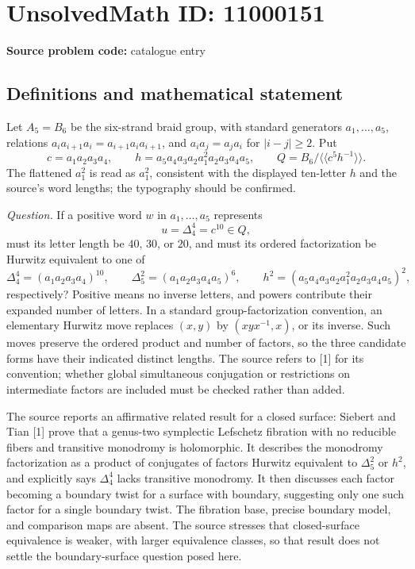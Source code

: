 \documentclass[11pt]{article}
\begin{document}
\section*{UnsolvedMath ID: 11000151}
\textbf{Source problem code:} catalogue entry
\subsection{Definitions and mathematical statement}
Let \(A_5=B_6\) be the six-strand braid group, with standard generators \(a_1,\ldots,a_5\), relations \(a_i a_{i+1}a_i=a_{i+1}a_i a_{i+1}\), and \(a_i a_j=a_j a_i\) for \(|i-j|\geq2\). Put
\[
 c=a_1a_2a_3a_4,\qquad
 h=a_5a_4a_3a_2a_1^2a_2a_3a_4a_5,
 \qquad Q=B_6/\langle\!\langle c^5h^{-1}\rangle\!\rangle.
\]
The flattened \(a^2_1\) is read as \(a_1^2\), consistent with the displayed ten-letter \(h\) and the source's word lengths; the typography should be confirmed.

\emph{Question.} If a positive word \(w\) in \(a_1,\ldots,a_5\) represents
\[
 u=\Delta_4^4=c^{10}\in Q,
\]
must its letter length be \(40\), \(30\), or \(20\), and must its ordered factorization be Hurwitz equivalent to one of
\[
 \Delta_4^4=(a_1a_2a_3a_4)^{10},\qquad
 \Delta_5^2=(a_1a_2a_3a_4a_5)^6,\qquad
 h^2=(a_5a_4a_3a_2a_1^2a_2a_3a_4a_5)^2,
\]
respectively? Positive means no inverse letters, and powers contribute their expanded number of letters. In a standard group-factorization convention, an elementary Hurwitz move replaces \((x,y)\) by \((xyx^{-1},x)\), or its inverse. Such moves preserve the ordered product and number of factors, so the three candidate forms have their indicated distinct lengths. The source refers to [1] for its convention; whether global simultaneous conjugation or restrictions on intermediate factors are included must be checked rather than added.

The source reports an affirmative related result for a closed surface: Siebert and Tian [1] prove that a genus-two symplectic Lefschetz fibration with no reducible fibers and transitive monodromy is holomorphic. It describes the monodromy factorization as a product of conjugates of factors Hurwitz equivalent to \(\Delta_5^2\) or \(h^2\), and explicitly says \(\Delta_4^4\) lacks transitive monodromy. It then discusses each factor becoming a boundary twist for a surface with boundary, suggesting only one such factor for a single boundary twist. The fibration base, precise boundary model, and comparison maps are absent. The source stresses that closed-surface equivalence is weaker, with larger equivalence classes, so that result does not settle the boundary-surface question posed here.
\end{document}
